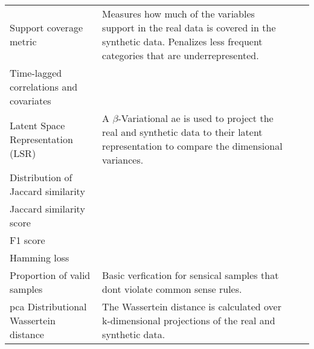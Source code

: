 \begin{table}
\begin{tabular}{@{} p{} p{} p{} p{} @{}}
            Support coverage metric & Measures how much of the variables support in the real data is covered in the synthetic data. Penalizes less frequent categories that are underrepresented. & \cite{Goncalves2020}\\
            
            Time-lagged correlations and covariates & {} & \cite{Fisher2019,walsh2020generating}\\
            
            Latent Space Representation (LSR) & A $\beta$-Variational \gls{ae} is used to project the real and synthetic data to their latent representation to compare the dimensional variances. & \cite{yan2020generating}\\
            
            Distribution of Jaccard similarity & {} & \cite{ozyigit2020generation}\\
            
            Jaccard similarity score & {} & \cite{Yang_2019_ehr}\\
            
            F1 score & {} & \cite{Yang_2019_ehr}\\
            
            Hamming loss & {} & \cite{Yang_2019_ehr}\\
            
            Proportion of valid samples & Basic verfication for sensical samples that dont violate common sense rules. & \cite{Yang_2019_ehr}\\
            
            
            
            \gls{pca} Distributional Wassertein distance & The Wassertein distance is calculated over k-dimensional projections of the real and synthetic data. & \cite{tanti2019}\\
            
            \bottomrule
        \end{tabular}
    \end{table}